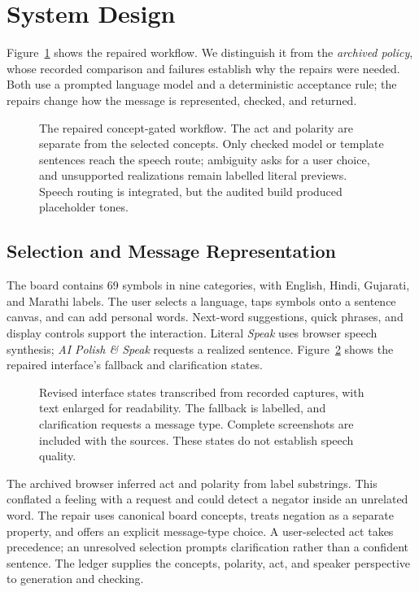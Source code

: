\section{System Design}
\label{sec:system}
Figure~\ref{fig:arch} shows the repaired workflow.
We distinguish it from the \emph{archived policy}, whose recorded comparison and failures establish why the repairs were needed.
Both use a prompted language model and a deterministic acceptance rule; the repairs change how the message is represented, checked, and returned.

\begin{figure}[t]
\centering

\caption{The repaired concept-gated workflow. The act and polarity are separate from the selected concepts. Only checked model or template sentences reach the speech route; ambiguity asks for a user choice, and unsupported realizations remain labelled literal previews. Speech routing is integrated, but the audited build produced placeholder tones.}
\label{fig:arch}
\end{figure}

\subsection{Selection and Message Representation}
The board contains 69 symbols in nine categories, with English, Hindi, Gujarati, and Marathi labels.
The user selects a language, taps symbols onto a sentence canvas, and can add personal words.
Next-word suggestions, quick phrases, and display controls support the interaction.
Literal \emph{Speak} uses browser speech synthesis; \emph{AI Polish \& Speak} requests a realized sentence.
Figure~\ref{fig:ui} shows the repaired interface's fallback and clarification states.

\begin{figure}[t]
\centering

\caption{Revised interface states transcribed from recorded captures, with text enlarged for readability. The fallback is labelled, and clarification requests a message type. Complete screenshots are included with the sources. These states do not establish speech quality.}
\label{fig:ui}
\end{figure}

The archived browser inferred act and polarity from label substrings.
This conflated a feeling with a request and could detect a negator inside an unrelated word.
The repair uses canonical board concepts, treats negation as a separate property, and offers an explicit message-type choice.
A user-selected act takes precedence; an unresolved selection prompts clarification rather than a confident sentence.
The ledger supplies the concepts, polarity, act, and speaker perspective to generation and checking.

